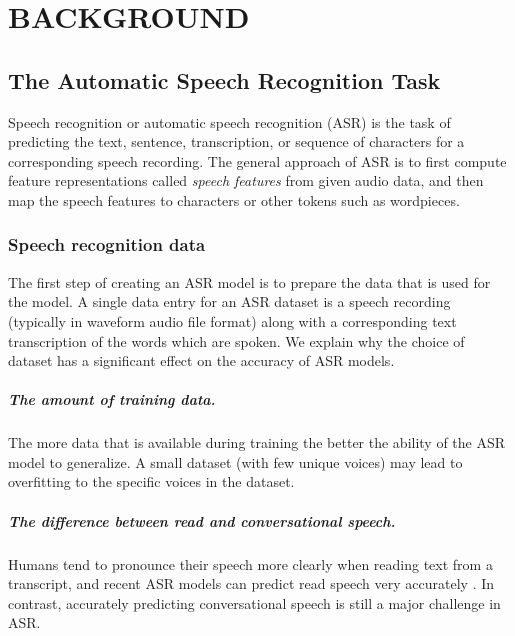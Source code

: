 \chapter{BACKGROUND}



\section{The Automatic Speech Recognition Task}\label{sec:background}
Speech recognition or automatic speech recognition (ASR) is the task of 
predicting the text, sentence, transcription, or sequence of characters 
for a corresponding speech recording.
The general approach of ASR is to first compute feature representations called \emph{speech features} from given audio data,
and then map the speech features to characters or other tokens such as wordpieces.



\subsection{Speech recognition data}
The first step of creating an ASR model is to prepare the data that is used for the model.
A single data entry for an ASR dataset is a speech recording (typically in waveform audio file format)
along with a corresponding text transcription of the words which are spoken.
We explain why the choice of dataset has a significant effect on the accuracy of ASR models.

\paragraph*{The amount of training data.} The more data that is available during training the better the ability
of the ASR model to generalize. A small dataset (with few unique voices) may lead to overfitting to the specific 
voices in the dataset.
\paragraph*{The difference between read and conversational speech.} Humans tend to pronounce their speech more clearly 
when reading text from a transcript, and recent ASR models can predict read speech very accurately \cite{jurafskyspeech}.
In contrast, accurately predicting conversational speech is still a major challenge in ASR.
